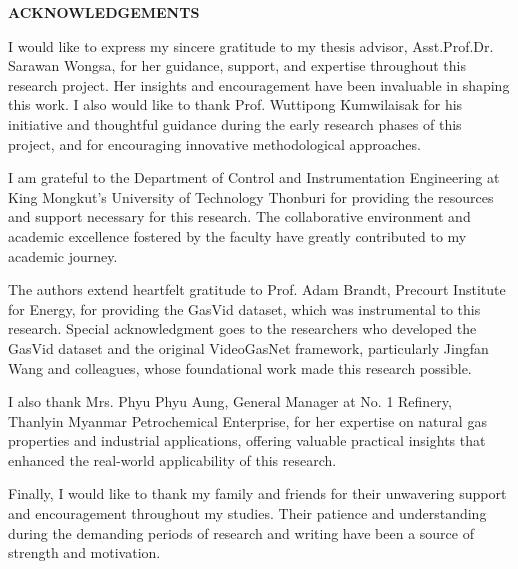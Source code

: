 \newpage
\thispagestyle{plain}

\begin{center}
\fontsize{15}{22.5}\selectfont\bfseries
ACKNOWLEDGEMENTS
\end{center}

\vspace{36pt}

\fontsize{12}{18}\selectfont
I would like to express my sincere gratitude to my thesis advisor, Asst.Prof.Dr. Sarawan Wongsa, for her guidance, support, and expertise throughout this research project. Her insights and encouragement have been invaluable in shaping this work. I also would like to thank Prof. Wuttipong Kumwilaisak for his initiative and thoughtful guidance during the early research phases of this project, and for encouraging innovative methodological approaches.

I am grateful to the Department of Control and Instrumentation Engineering at King Mongkut's University of Technology Thonburi for providing the resources and support necessary for this research. The collaborative environment and academic excellence fostered by the faculty have greatly contributed to my academic journey.

The authors extend heartfelt gratitude to Prof. Adam Brandt, Precourt Institute for Energy, for providing the GasVid dataset, which was instrumental to this research. Special acknowledgment goes to the researchers who developed the GasVid dataset and the original VideoGasNet framework, particularly Jingfan Wang and colleagues, whose foundational work made this research possible.

I also thank Mrs. Phyu Phyu Aung, General Manager at No. 1 Refinery, Thanlyin Myanmar Petrochemical Enterprise, for her expertise on natural gas properties and industrial applications, offering valuable practical insights that enhanced the real-world applicability of this research.

Finally, I would like to thank my family and friends for their unwavering support and encouragement throughout my studies. Their patience and understanding during the demanding periods of research and writing have been a source of strength and motivation.
